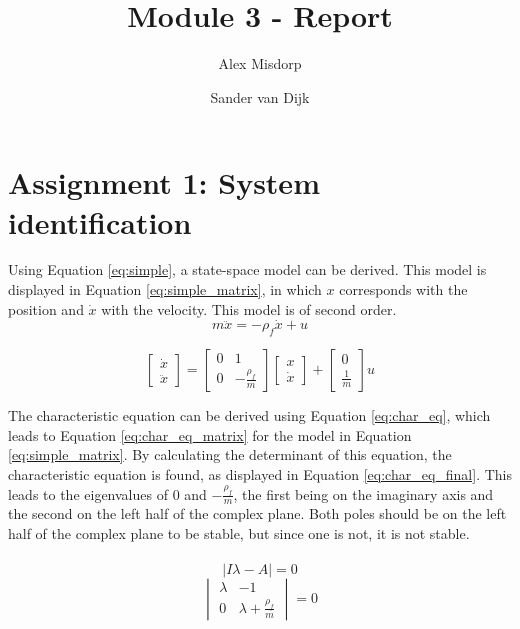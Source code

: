 \documentclass[final]{scrreprt} %
\title{Module 3 - Report}
\author{Alex {Misdorp} \and Sander {van Dijk}}
\begin{document}
\chapter{Assignment 1: System identification}
Using Equation \ref{eq:simple}, a state-space model can be derived. This model is displayed in Equation \ref{eq:simple_matrix}, in which $x$ corresponds with the position and $\dot{x}$ with the velocity. This model is of second order.
\begin{equation}
	m \ddot{x} = -\rho_f \dot{x} + u
	\label{eq:simple}
\end{equation}

\begin{equation}
	\begin{bmatrix}
		\dot{x} \\
		\ddot{x}
	\end{bmatrix} =
	\begin{bmatrix}
		0 & 1 \\
		0 & -\frac{\rho_f}{m}
	\end{bmatrix}
	\begin{bmatrix}
		x \\
		\dot{x}
	\end{bmatrix} +
	\begin{bmatrix}
		0 \\
		\frac{1}{m}
	\end{bmatrix}
	u
	\label{eq:simple_matrix}
\end{equation}

The characteristic equation can be derived using Equation \ref{eq:char_eq}, which leads to Equation \ref{eq:char_eq_matrix} for the model in Equation \ref{eq:simple_matrix}. By calculating the determinant of this equation, the characteristic equation is found, as displayed in Equation \ref{eq:char_eq_final}. This leads to the eigenvalues of $0$ and $-\frac{\rho_f}{m}$, the first being on the imaginary axis and the second on the left half of the complex plane. Both poles should be on the left half of the complex plane to be stable, but since one is not, it is not stable.
\\ \\
\begin{equation}
	\left| I \lambda - A \right| = 0
	\label{eq:char_eq}
\end{equation}
\begin{equation}
	\begin{vmatrix}
		\lambda & -1 \\
		0 & \lambda + \frac{\rho_f}{m}
	\end{vmatrix} = 0
	\label{eq:char_eq_matrix}
\end{equation}
\end{document}
